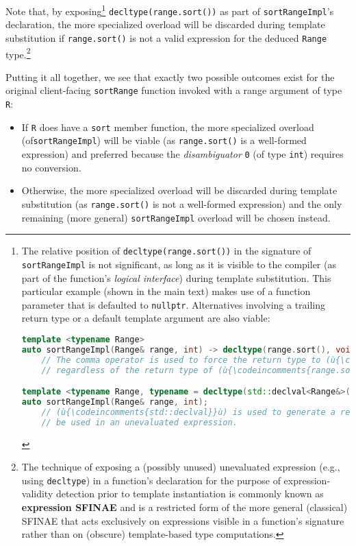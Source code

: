 \noindent Note that, by exposing{\cprotect\footnote{The relative position of
\texttt{decltype(range.sort())} in the signature of
\texttt{sortRangeImpl} is not significant, as long as it is visible to
the compiler (as part of the function's \emph{logical interface})
during template substitution. This particular example (shown in the
main text) makes use of a function parameter that is defaulted to
\texttt{nullptr}. Alternatives involving a trailing return type or a
default template argument are also viable:

\begin{lstlisting}[language=C++, basicstyle={\ttfamily\footnotesize}]
template <typename Range>
auto sortRangeImpl(Range& range, int) -> decltype(range.sort(), void());
    // The comma operator is used to force the return type to (ù{\codeincomments{void}}ù),
    // regardless of the return type of (ù{\codeincomments{range.sort()}}ù).

template <typename Range, typename = decltype(std::declval<Range&>().sort()>
auto sortRangeImpl(Range& range, int);
    // (ù{\codeincomments{std::declval}}ù) is used to generate a reference to (ù{\codeincomments{Range}}ù) that can
    // be used in an unevaluated expression.
\end{lstlisting}
      }} \texttt{decltype(range.sort())} as part of
\texttt{sortRangeImpl}'s declaration, the more specialized overload will
be discarded during template substitution if \texttt{range.sort()} is
not a valid expression for the deduced \texttt{Range}
type.{\cprotect\footnote{The technique of exposing a (possibly unused)
unevaluated expression (e.g., using \texttt{decltype}) in a function's
declaration for the purpose of expression-validity detection prior to
template instantiation is commonly known as \textbf{expression SFINAE}
and is a restricted form of the more general (classical) SFINAE that acts exclusively on
expressions visible in a function's signature rather than on (obscure)
  template-based type computations.}}

Putting it all together, we see that exactly two possible
outcomes exist for the original client-facing \texttt{sortRange} function
invoked with a range argument of type \texttt{R}:

\begin{itemize}
\item{If \texttt{R} does have a \texttt{sort} member function, the more specialized overload (of\linebreak[4] \texttt{sortRangeImpl}) will be viable (as \texttt{range.sort()} is a well-formed expression) and preferred because the \emph{disambiguator} \texttt{0} (of type \texttt{int}) requires no conversion.}
\item{Otherwise, the more specialized overload will be discarded during template substitution (as \texttt{range.sort()} is not a well-formed expression) and the only remaining (more general) \texttt{sortRangeImpl} overload will be chosen instead.}
\end{itemize}

